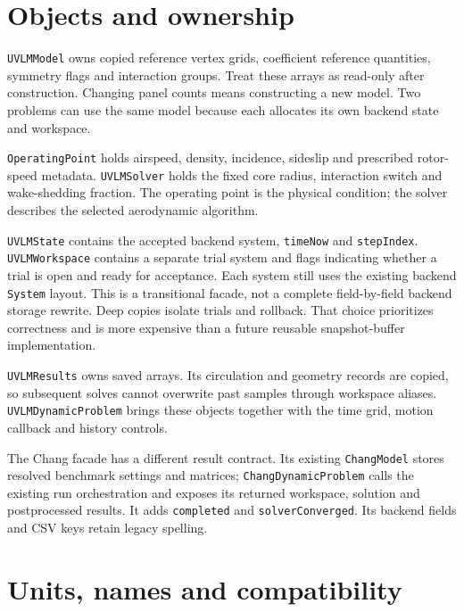 \documentclass[11pt,a4paper]{article}
\newcommand{\code}{\nolinkurl}
\begin{document}
\section{Objects and ownership}

\code{UVLMModel} owns copied reference vertex grids, coefficient reference
quantities, symmetry flags and interaction groups. Treat these arrays as
read-only after construction. Changing panel counts means constructing a new
model. Two problems can use the same model because each allocates its own
backend state and workspace.

\code{OperatingPoint} holds airspeed, density, incidence, sideslip and
prescribed rotor-speed metadata. \code{UVLMSolver} holds the fixed core radius,
interaction switch and wake-shedding fraction. The operating point is the
physical condition; the solver describes the selected aerodynamic algorithm.

\code{UVLMState} contains the accepted backend system, \code{timeNow} and
\code{stepIndex}. \code{UVLMWorkspace} contains a separate trial system and
flags indicating whether a trial is open and ready for acceptance. Each
system still uses the existing backend \code{System} layout. This is a
transitional facade, not a complete field-by-field backend storage rewrite.
Deep copies isolate trials and rollback. That choice prioritizes correctness
and is more expensive than a future reusable snapshot-buffer implementation.

\code{UVLMResults} owns saved arrays. Its circulation and geometry records
are copied, so subsequent solves cannot overwrite past samples through
workspace aliases. \code{UVLMDynamicProblem} brings these objects together
with the time grid, motion callback and history controls.

The Chang facade has a different result contract. Its existing \code{ChangModel}
stores resolved benchmark settings and matrices; \code{ChangDynamicProblem}
calls the existing run orchestration and exposes its returned workspace,
solution and postprocessed results. It adds \code{completed} and
\code{solverConverged}. Its backend fields and CSV keys retain legacy spelling.

\section{Units, names and compatibility}
\end{document}

